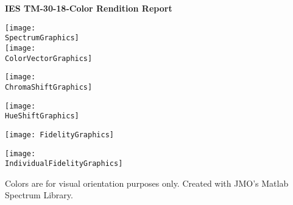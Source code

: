 \documentclass[a4paper,10pt]{article}
\begin{document}

{\Large
\begin{center}
\textbf{IES TM-30-18-Color Rendition Report}
\end{center}}

\colorbox{black!5}{\strut\makebox[63mm][l]{\Source}}%
\hspace{10mm}%
\colorbox{black!5}{\strut\makebox[53mm][l]{\Manufacturer}}

\colorbox{black!5}{\makebox[63mm][l]{\strut\Date}}%
\hspace{10mm}%
\colorbox{black!5}{\makebox[63mm][l]{\strut\Model}}

\begin{minipage}[b][128mm]{0.48\textwidth}
\texttt{[image: \\SpectrumGraphics]}\\[3mm]
\texttt{[image: \\ColorVectorGraphics]}%
\end{minipage}%
\hspace{0.04\textwidth}%
\begin{minipage}[b][125mm]{0.48\textwidth}
\texttt{[image: \\ChromaShiftGraphics]}
\par\vfill\par
\texttt{[image: \\HueShiftGraphics]}
\par\vfill\par
\texttt{[image: FidelityGraphics]}
\end{minipage}

\vspace{3mm}
\texttt{[image: \\IndividualFidelityGraphics]}
\vspace{3mm}

\begin{minipage}[t][28mm]{90mm}
\colorbox{black!5}{\strut\parbox[t][28mm]{73mm}{\Notes}}%
\end{minipage}
\hspace{5mm}
\hspace{5mm}

\vspace{12mm}
\centering
Colors are for visual orientation purposes only. Created with JMO's Matlab Spectrum Library.
\end{document}
